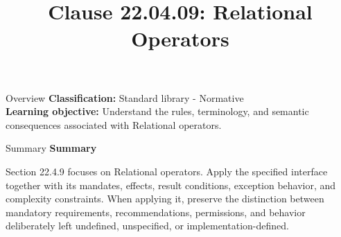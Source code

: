 \documentclass[10pt,letterpaper]{article}
\title{Clause 22.04.09: Relational Operators}
\author{}
\date{}
\begin{document}
\maketitle
\begin{CornellOverviewBox}{Overview}
\textbf{Classification:} Standard library - Normative\\[2pt]
\textbf{Learning objective:} Understand the rules, terminology, and semantic consequences associated with Relational operators.
\end{CornellOverviewBox}\begin{CornellSummaryBox}{Summary}
{\sffamily\bfseries\color{Accent} Summary}\par\vspace{3pt}Section 22.4.9 focuses on Relational operators. Apply the specified interface together with its mandates, effects, result conditions, exception behavior, and complexity constraints. When applying it, preserve the distinction between mandatory requirements, recommendations, permissions, and behavior deliberately left undefined, unspecified, or implementation-defined.
\end{CornellSummaryBox}
\end{document}
